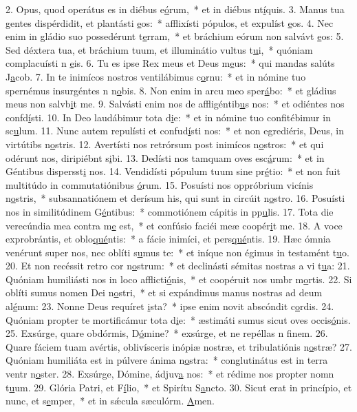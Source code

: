 2. Opus, quod operátus es in diébus e\uline{ó}rum,~* et in diébus nt\uline{í}quis.
3. Manus tua gentes dispérdidit, et plantásti \uline{e}os:~* afflixísti pópulos, et expulíst \uline{e}os.
4. Nec enim in gládio suo possedérunt t\uline{e}rram,~* et bráchium eórum non salvávt \uline{e}os:
5. Sed déxtera tua, et bráchium tuum, et illuminátio vultus t\uline{u}i,~* quóniam complacuísti n \uline{e}is.
6. Tu es ipse Rex meus et Deus m\uline{e}us:~* qui mandas salúts J\uline{a}cob.
7. In te inimícos nostros ventilábimus c\uline{o}rnu:~* et in nómine tuo spernémus insurgéntes n n\uline{o}bis.
8. Non enim in arcu meo sper\uline{á}bo:~* et gládius meus non salvb\uline{i}t me.
9. Salvásti enim nos de affligéntib\uline{u}s nos:~* et odiéntes nos confd\uline{í}sti.
10. In Deo laudábimur tota d\uline{i}e:~* et in nómine tuo confitébimur in sc\uline{u}lum.
11. Nunc autem repulísti et confud\uline{í}sti nos:~* et non egrediéris, Deus, in virtútibs n\uline{o}stris.
12. Avertísti nos retrórsum post inimícos n\uline{o}stros:~* et qui odérunt nos, diripiébnt s\uline{i}bi.
13. Dedísti nos tamquam oves esc\uline{á}rum:~* et in Géntibus dispersst\uline{i} nos.
14. Vendidísti pópulum tuum sine pr\uline{é}tio:~* et non fuit multitúdo in commutatiónibus \uline{ó}rum.
15. Posuísti nos oppróbrium vicínis n\uline{o}stris,~* subsannatiónem et derísum his, qui sunt in circúit n\uline{o}stro.
16. Posuísti nos in similitúdinem G\uline{é}ntibus:~* commotiónem cápitis in pp\uline{u}lis.
17. Tota die verecúndia mea contra m\uline{e} est,~* et confúsio faciéi meæ coopér\uline{i}t me.
18. A voce exprobrántis, et oblo\uline{qué}ntis:~* a fácie inimíci, et pers\uline{qué}ntis.
19. Hæc ómnia venérunt super nos, nec oblíti s\uline{u}mus te:~* et iníque non égimus in testamént t\uline{u}o.
20. Et non recéssit retro cor n\uline{o}strum:~* et declinásti sémitas nostras a vi t\uline{u}a:
21. Quóniam humiliásti nos in loco afflicti\uline{ó}nis,~* et coopéruit nos umbr m\uline{o}rtis.
22. Si oblíti sumus nomen Dei n\uline{o}stri,~* et si expándimus manus nostras ad deum al\uline{é}num:
23. Nonne Deus requíret \uline{i}sta?~* ipse enim novit abscóndit c\uline{o}rdis.
24. Quóniam propter te mortificámur tota d\uline{i}e:~* æstimáti sumus sicut oves occis\uline{ó}nis.
25. Exsúrge, quare obdórmis, D\uline{ó}mine?~* exsúrge, et ne repéllas n f\uline{i}nem.
26. Quare fáciem tuam avértis, oblivísceris inópiæ nostræ, et tribulatiónis n\uline{o}stræ?
27. Quóniam humiliáta est in púlvere ánima n\uline{o}stra:~* conglutinátus est in terra ventr n\uline{o}ster.
28. Exsúrge, Dómine, ádjuv\uline{a} nos:~* et rédime nos propter nomn t\uline{u}um.
29. Glória Patri, et F\uline{í}lio,~* et Spirítu S\uline{a}ncto.
30. Sicut erat in princípio, et nunc, et s\uline{e}mper,~* et in sǽcula sæculórm. \uline{A}men.
